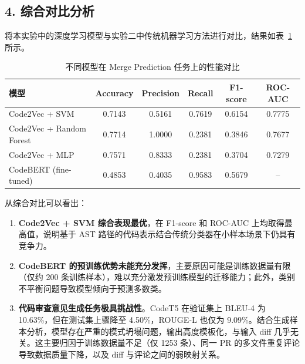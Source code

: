 \documentclass{experimentreport}
\begin{document}
{\subsection*{4. 综合对比分析}

将本实验中的深度学习模型与实验二中传统机器学习方法进行对比，结果如表~\ref{tab:comparison} 所示。

\begin{table}[htbp]
\centering
\caption{不同模型在 Merge Prediction 任务上的性能对比}
\label{tab:comparison}
\begin{tabular}{lccccc}
\hline
\textbf{模型} & \textbf{Accuracy} & \textbf{Precision} & \textbf{Recall} & \textbf{F1-score} & \textbf{ROC-AUC} \\
\hline
Code2Vec + SVM       & 0.7143 & 0.5161 & 0.7619 & 0.6154 & 0.7775 \\
Code2Vec + Random Forest & 0.7714 & 1.0000 & 0.2381 & 0.3846 & 0.7677 \\
Code2Vec + MLP       & 0.7571 & 0.8333 & 0.2381 & 0.3704 & 0.7279 \\
CodeBERT (fine-tuned)& 0.4853 & 0.4035 & 0.9583 & 0.5679 & -- \\
\hline
\end{tabular}
\end{table}

从综合对比可以看出：
\begin{enumerate}
    \item \textbf{Code2Vec + SVM 综合表现最优}，在 F1-score 和 ROC-AUC 上均取得最高值，说明基于 AST 路径的代码表示结合传统分类器在小样本场景下仍具有竞争力。
    \item \textbf{CodeBERT 的预训练优势未能充分发挥}，主要原因可能是训练数据量有限（仅约 200 条训练样本），难以充分激发预训练模型的迁移能力；此外，类别不平衡问题导致模型倾向于预测多数类。
    \item \textbf{代码审查意见生成任务极具挑战性}。CodeT5 在验证集上 BLEU-4 为 10.63\%，但在测试集上骤降至 4.50\%，ROUGE-L 也仅为 9.09\%。结合生成样本分析，模型存在严重的模式坍塌问题，输出高度模板化，与输入 diff 几乎无关。这主要归因于训练数据量不足（仅 1253 条）、同一 PR 的多文件重复评论导致数据质量下降，以及 diff 与评论之间的弱映射关系。
\end{enumerate}

}






\teachercomment
\end{document}
